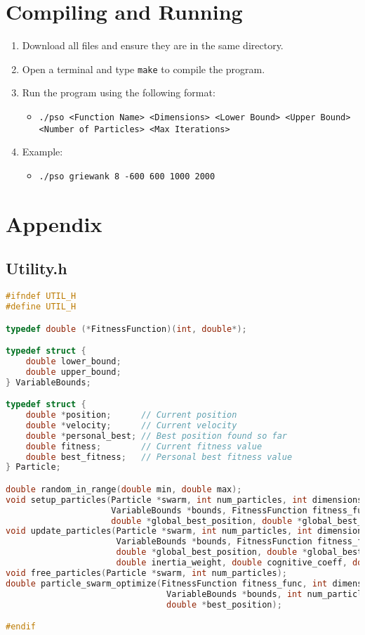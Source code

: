 \documentclass[12pt]{article}
\begin{document}
\section{Compiling and Running}
\begin{enumerate}
    \item Download all files and ensure they are in the same directory.
    \item Open a terminal and type \texttt{make} to compile the program.
    \item Run the program using the following format:
    \begin{itemize}
        \item \texttt{./pso <Function Name> <Dimensions> <Lower Bound> <Upper Bound> <Number of Particles> <Max Iterations>}
    \end{itemize}
    \item Example:
    \begin{itemize}
        \item \texttt{./pso griewank 8 -600 600 1000 2000}
    \end{itemize}
\end{enumerate}

\section{Appendix}

\subsection{Utility.h}
\begin{lstlisting}[language=C]
#ifndef UTIL_H
#define UTIL_H

typedef double (*FitnessFunction)(int, double*);

typedef struct {
    double lower_bound;
    double upper_bound;
} VariableBounds;

typedef struct {
    double *position;      // Current position
    double *velocity;      // Current velocity
    double *personal_best; // Best position found so far
    double fitness;        // Current fitness value
    double best_fitness;   // Personal best fitness value
} Particle;

double random_in_range(double min, double max);
void setup_particles(Particle *swarm, int num_particles, int dimensions,
                     VariableBounds *bounds, FitnessFunction fitness_func,
                     double *global_best_position, double *global_best_fitness);
void update_particles(Particle *swarm, int num_particles, int dimensions,
                      VariableBounds *bounds, FitnessFunction fitness_func,
                      double *global_best_position, double *global_best_fitness,
                      double inertia_weight, double cognitive_coeff, double social_coeff);
void free_particles(Particle *swarm, int num_particles);
double particle_swarm_optimize(FitnessFunction fitness_func, int dimensions,
                                VariableBounds *bounds, int num_particles, int max_iterations,
                                double *best_position);

#endif
\end{lstlisting}
\end{document}
